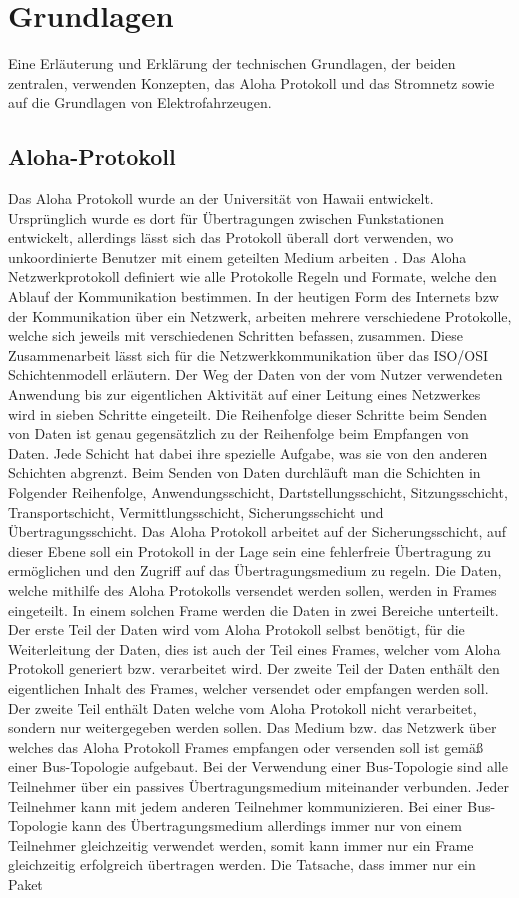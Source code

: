 \chapter{Grundlagen}
\label{chap:grundlagen}

Eine Erläuterung und Erklärung der technischen Grundlagen, der beiden zentralen, verwenden Konzepten, das Aloha Protokoll und das Stromnetz sowie auf die Grundlagen von Elektrofahrzeugen.
\section{Aloha-Protokoll}
Das Aloha Protokoll wurde an der Universität von Hawaii entwickelt. Ursprünglich wurde es dort für Übertragungen zwischen Funkstationen entwickelt, allerdings lässt sich das Protokoll überall dort verwenden, wo unkoordinierte Benutzer mit einem geteilten Medium arbeiten \cite{Back_AlohaPure}. Das Aloha Netzwerkprotokoll definiert wie alle Protokolle Regeln und Formate, welche den Ablauf der Kommunikation bestimmen. In der heutigen Form des Internets bzw der Kommunikation über ein Netzwerk, arbeiten mehrere verschiedene Protokolle, welche sich jeweils mit verschiedenen Schritten befassen, zusammen. Diese Zusammenarbeit lässt sich für die Netzwerkkommunikation über das ISO/OSI Schichtenmodell erläutern. Der Weg der Daten von der vom Nutzer verwendeten Anwendung bis zur eigentlichen Aktivität auf einer Leitung eines Netzwerkes wird in sieben Schritte eingeteilt. Die Reihenfolge dieser Schritte beim Senden von Daten ist genau gegensätzlich zu der Reihenfolge beim Empfangen von Daten. Jede Schicht hat dabei ihre spezielle Aufgabe, was sie von den anderen Schichten abgrenzt. Beim Senden von Daten durchläuft man die Schichten in Folgender Reihenfolge, Anwendungsschicht, Dartstellungsschicht, Sitzungsschicht, Transportschicht, Vermittlungsschicht, Sicherungsschicht und Übertragungsschicht. Das Aloha Protokoll arbeitet auf der Sicherungsschicht, auf dieser Ebene soll ein Protokoll in der Lage sein eine fehlerfreie Übertragung zu ermöglichen und den Zugriff auf das Übertragungsmedium zu regeln. Die Daten, welche mithilfe des Aloha Protokolls versendet werden sollen, werden in Frames eingeteilt. In einem solchen Frame werden die Daten in zwei Bereiche unterteilt. Der erste Teil der Daten wird vom Aloha Protokoll selbst benötigt, für die Weiterleitung der Daten, dies ist auch der Teil eines Frames, welcher vom Aloha Protokoll generiert bzw. verarbeitet wird. Der zweite Teil der Daten enthält den eigentlichen Inhalt des Frames, welcher versendet oder empfangen werden soll. Der zweite Teil enthält Daten welche vom Aloha Protokoll nicht verarbeitet, sondern nur weitergegeben werden sollen. Das Medium bzw. das Netzwerk über welches das Aloha Protokoll Frames empfangen oder versenden soll ist gemäß einer Bus-Topologie aufgebaut. Bei der Verwendung einer Bus-Topologie sind alle Teilnehmer über ein passives Übertragungsmedium miteinander verbunden. Jeder Teilnehmer kann mit jedem anderen Teilnehmer kommunizieren. Bei einer Bus-Topologie kann des Übertragungsmedium allerdings immer nur von einem Teilnehmer gleichzeitig verwendet werden, somit kann immer nur ein Frame gleichzeitig erfolgreich übertragen werden. Die Tatsache, dass immer nur ein Paket 